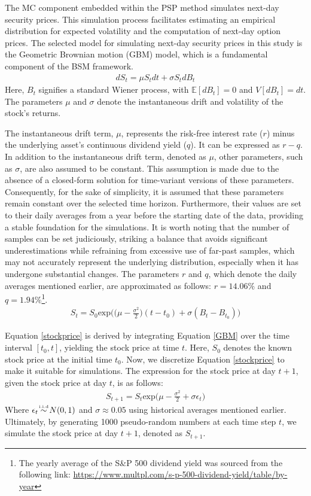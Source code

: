 The MC component embedded within the PSP method simulates next-day security prices. This simulation process facilitates estimating an empirical distribution for expected volatility and the computation of next-day option prices. The selected model for simulating next-day security prices in this study is the Geometric Brownian motion (GBM) model, which is a fundamental component of the BSM framework.
\begin{align}
    dS_t = \mu S_tdt + \sigma S_t dB_t \label{GBM}
\end{align}
Here, $B_t$ signifies a standard Wiener process, with $\mathbb{E}[dB_t]=0$ and $V[dB_t]=dt$. The parameters $\mu$ and $\sigma$ denote the instantaneous drift and volatility of the stock's returns. 

The instantaneous drift term, $\mu$, represents the risk-free interest rate ($r$) minus the underlying asset's continuous dividend yield ($q$). It can be expressed as $r - q$. In addition to the instantaneous drift term, denoted as $\mu$, other parameters, such as $\sigma$, are also assumed to be constant. This assumption is made due to the absence of a closed-form solution for time-variant versions of these parameters. Consequently, for the sake of simplicity, it is assumed that these parameters remain constant over the selected time horizon. Furthermore, their values are set to their daily averages from a year before the starting date of the data, providing a stable foundation for the simulations. It is worth noting that the number of samples can be set judiciously, striking a balance that avoids significant underestimations while refraining from excessive use of far-past samples, which may not accurately represent the underlying distribution, especially when it has undergone substantial changes. The parameters $r$ and $q$, which denote the daily averages mentioned earlier, are approximated as follows: $r = 14.06\%$ and $q = 1.94\%$\footnote{The yearly average of the S\&P 500 dividend yield was sourced from the following link: \url{https://www.multpl.com/s-p-500-dividend-yield/table/by-year}}.
\begin{align}
    S_t = S_0 \text{exp}\Big(\Big(\mu - \frac{\sigma^2}{2}\Big)(t - t_0) + \sigma(B_t - B_{t_0})\Big) \label{stockprice}
\end{align}

Equation \eqref{stockprice} is derived by integrating Equation \eqref{GBM} over the time interval $[t_0, t]$, yielding the stock price at time $t$. Here, $S_0$ denotes the known stock price at the initial time $t_0$. Now, we discretize Equation \eqref{stockprice} to make it suitable for simulations. The expression for the stock price at day $t+1$, given the stock price at day $t$, is as follows:
\begin{align}
    S_{t+1} = S_t \text{exp}\Big(\mu - \frac{\sigma^2}{2} + \sigma\epsilon_t\Big) \label{stockprice_discrete}
\end{align}
Where $\epsilon_t \simiid N(0,1)$ and $\sigma \approx 0.05$ using historical averages mentioned earlier. Ultimately, by generating 1000 pseudo-random numbers at each time step $t$, we simulate the stock price at day $t+1$, denoted as $S_{t+1}$.

